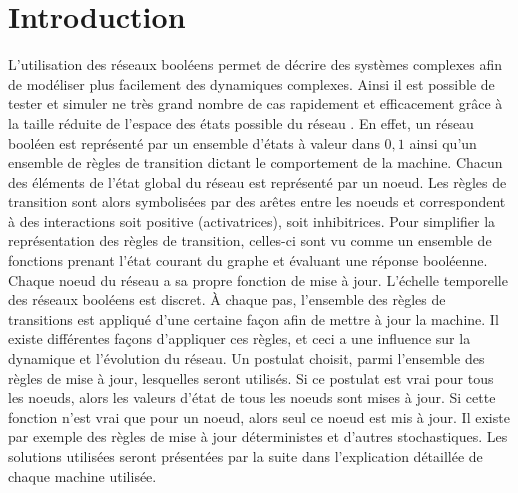 \documentclass[11pt, a4paper]{article}
\begin{document}
\section{Introduction}
L'utilisation des réseaux booléens permet de décrire des systèmes complexes
afin de modéliser plus facilement des dynamiques complexes. Ainsi il est possible de
tester et simuler ne très grand nombre de cas rapidement et efficacement grâce
à la taille réduite de l'espace des états possible du réseau \cite{greil2012}.
En effet, un réseau booléen est représenté par un ensemble d'états à valeur
dans $ {0, 1} $ ainsi qu'un ensemble de règles de transition dictant le
comportement de la machine. Chacun des éléments de l'état global du réseau est
représenté par un noeud. Les règles de transition sont alors symbolisées par
des arêtes entre les noeuds et correspondent à des interactions soit positive
(activatrices), soit inhibitrices. Pour simplifier la représentation des règles
de transition, celles-ci sont vu comme un ensemble de fonctions prenant l'état
courant du graphe et évaluant une réponse booléenne. Chaque noeud du réseau a sa
propre fonction de mise à jour. L'échelle temporelle des réseaux booléens est
discret. À chaque pas, l'ensemble des règles de transitions est appliqué d'une
certaine façon afin de mettre à jour la machine. Il existe différentes façons
d'appliquer ces règles, et ceci a une influence sur la dynamique et l'évolution
du réseau. Un postulat choisit, parmi l'ensemble des règles de mise à jour,
lesquelles seront utilisés. Si ce postulat est vrai pour tous les noeuds, alors les valeurs
d'état de tous les noeuds sont mises à jour. Si cette fonction n'est vrai que pour un
noeud, alors seul ce noeud est mis à jour. Il existe par exemple des
règles de mise à jour déterministes et d'autres stochastiques. Les solutions
utilisées seront présentées par la suite dans l'explication détaillée de chaque
machine utilisée. \\
\end{document}
